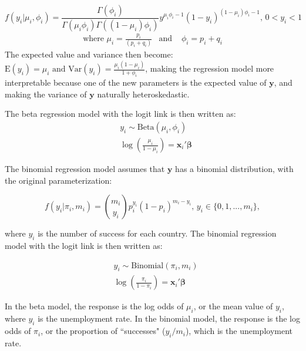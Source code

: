 \documentclass[letterpaper,11pt]{article}
\begin{document}
\begin{equation}
f(y_i|\mu_i, \phi_i) = \frac{\Gamma (\phi_i)}{\Gamma (\mu_i \phi_i) \Gamma ((1-\mu_i)\phi_i)}y^{\mu_i\phi_i - 1}(1-y_i)^{(1-\mu_i)\phi_i-1} \text{, }  0<y_i<1
\end{equation}
\begin{eqnarray*}
\text{where } \mu_i = \frac{p_i} {(p_i + q_i)} & \text{and } & \phi_i = p_i + q_i
\end{eqnarray*}
The expected value and variance then become: $\text{E}(y_i) = \mu_i \text{ and } \text{Var}(y_i) = \frac{\mu_i(1-\mu_i)}{1+\phi_i}$, making the regression model more interpretable because one of the new parameters is the expected value of $\mathbf{y}$, and making the variance of $\mathbf{y}$ naturally heteroskedastic.

The beta regression model with the logit link is then written as:
\begin{equation}
\begin{aligned}
         &y_i \sim \text{Beta}(\mu_i,\phi_i) \\
          &\log \left(\frac{\mu_i}{1-\mu_i}\right) = \mathbf{x}_i' \boldsymbol{\beta}
    \end{aligned}
\end{equation}

The binomial regression model assumes that $\mathbf{y}$ has a binomial distribution, with the original parameterization:

\begin{equation}
f(y_i|\pi_i, m_i) = \binom{m_i}{y_i} p_i^{y_i}(1-p_i)^{m_i-y_i} \text{, } y_i \in \{0,1,...,m_i\} ,
\end{equation}

where $y_i$ is the number of success for each country. The binomial regression model with the logit link is then written as:

\begin{equation}
    \begin{aligned}
         &y_i \sim \text{Binomial}(\pi_i,m_i) \\
          &\log \left(\frac{\pi_i}{1-\pi_i}\right) =  \mathbf{x}_i'\boldsymbol{\beta}
    \end{aligned}
\end{equation}

In the beta model, the response is the log odds of $\mu_i$, or the mean value of $y_i$, where $y_i$ is the unemployment rate. In the binomial model, the response is the log odds of $\pi_i$, or the proportion of ``successes" ($y_i/m_i$), which is the unemployment rate.
\end{document}
